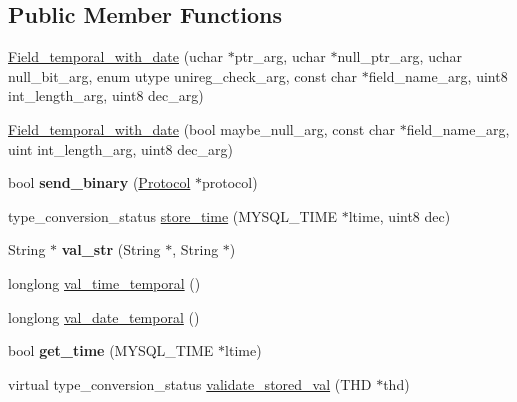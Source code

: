 \subsection*{Public Member Functions}
\begin{DoxyCompactItemize}
\item 
\mbox{\hyperlink{classField__temporal__with__date_add449ec4ea8b3be7ee002d3def0a9c02}{Field\+\_\+temporal\+\_\+with\+\_\+date}} (uchar $\ast$ptr\+\_\+arg, uchar $\ast$null\+\_\+ptr\+\_\+arg, uchar null\+\_\+bit\+\_\+arg, enum utype unireg\+\_\+check\+\_\+arg, const char $\ast$field\+\_\+name\+\_\+arg, uint8 int\+\_\+length\+\_\+arg, uint8 dec\+\_\+arg)
\item 
\mbox{\hyperlink{classField__temporal__with__date_a6898bd8188ce0c64a09ef367efdad6f3}{Field\+\_\+temporal\+\_\+with\+\_\+date}} (bool maybe\+\_\+null\+\_\+arg, const char $\ast$field\+\_\+name\+\_\+arg, uint int\+\_\+length\+\_\+arg, uint8 dec\+\_\+arg)
\item 
\mbox{\label{classField__temporal__with__date_a7f3f2b122718792ee65e28cf75b7deca}} 
bool {\bfseries send\+\_\+binary} (\mbox{\hyperlink{classProtocol}{Protocol}} $\ast$protocol)
\item 
type\+\_\+conversion\+\_\+status \mbox{\hyperlink{classField__temporal__with__date_aa93167bb62fc7b8e0428ef1e3baaaf7c}{store\+\_\+time}} (M\+Y\+S\+Q\+L\+\_\+\+T\+I\+ME $\ast$ltime, uint8 dec)
\item 
\mbox{\label{classField__temporal__with__date_a335cc272ad6b188a673a7e8d3edd28d0}} 
String $\ast$ {\bfseries val\+\_\+str} (String $\ast$, String $\ast$)
\item 
longlong \mbox{\hyperlink{classField__temporal__with__date_acf8330ac7e19ae7bdf978fc811e49c00}{val\+\_\+time\+\_\+temporal}} ()
\item 
longlong \mbox{\hyperlink{classField__temporal__with__date_a3d1a5e9fb109d1da223753c6072436ab}{val\+\_\+date\+\_\+temporal}} ()
\item 
\mbox{\label{classField__temporal__with__date_ac71f02e96f3a525349feb97f4d035c85}} 
bool {\bfseries get\+\_\+time} (M\+Y\+S\+Q\+L\+\_\+\+T\+I\+ME $\ast$ltime)
\item 
virtual type\+\_\+conversion\+\_\+status \mbox{\hyperlink{classField__temporal__with__date_af9ebe4d96a6a81232e4a41e4b1d7b599}{validate\+\_\+stored\+\_\+val}} (T\+HD $\ast$thd)
\end{DoxyCompactItemize}
